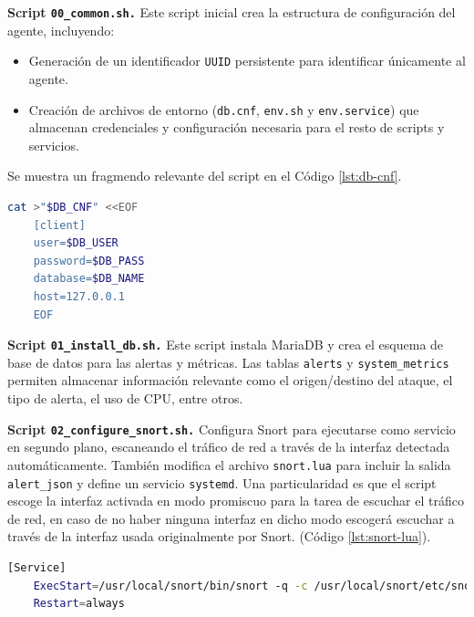\documentclass[11pt,a4paper,twoside]{report}
\begin{document}
\textbf{Script \texttt{00\_common.sh.}} Este script inicial crea la estructura de configuración del agente, incluyendo:

\begin{itemize}
	\item Generación de un identificador \texttt{UUID} persistente para identificar únicamente al agente.
	\item Creación de archivos de entorno (\texttt{db.cnf}, \texttt{env.sh} y \texttt{env.service}) que almacenan credenciales y configuración necesaria para el resto de scripts y servicios.
\end{itemize}

Se muestra un fragmendo relevante del script en el Código \ref{lst:db-cnf}.

\begin{lstlisting}[language=bash, caption={Fragmento de creación del archivo db.cnf.}, label={lst:db-cnf}]
	cat >"$DB_CNF" <<EOF
	[client]
	user=$DB_USER
	password=$DB_PASS
	database=$DB_NAME
	host=127.0.0.1
	EOF
\end{lstlisting}

\textbf{Script \texttt{01\_install\_db.sh.}} Este script instala MariaDB y crea el esquema de base de datos para las alertas y métricas. Las tablas \texttt{alerts} y \texttt{system\_metrics} permiten almacenar información relevante como el origen/destino del ataque, el tipo de alerta, el uso de CPU, entre otros.\newline

\textbf{Script \texttt{02\_configure\_snort.sh.}} Configura Snort para ejecutarse como servicio en segundo plano, escaneando el tráfico de red a través de la interfaz detectada automáticamente. También modifica el archivo \texttt{snort.lua} para incluir la salida \texttt{alert\_json} y define un servicio \texttt{systemd}. Una particularidad es que el script escoge la interfaz activada en modo promiscuo para la tarea de escuchar el tráfico de red, en caso de no haber ninguna interfaz en dicho modo escogerá escuchar a través de la interfaz usada originalmente por Snort. (Código \ref{lst:snort-lua}).

\begin{lstlisting}[language=bash, caption={Definición del servicio systemd para Snort.}, label={lst:snort-lua}]
	[Service]
	ExecStart=/usr/local/snort/bin/snort -q -c /usr/local/snort/etc/snort/snort.lua -i $IFACE -A alert_json -l /opt/snort/logs/live
	Restart=always
\end{lstlisting}
\end{document}
